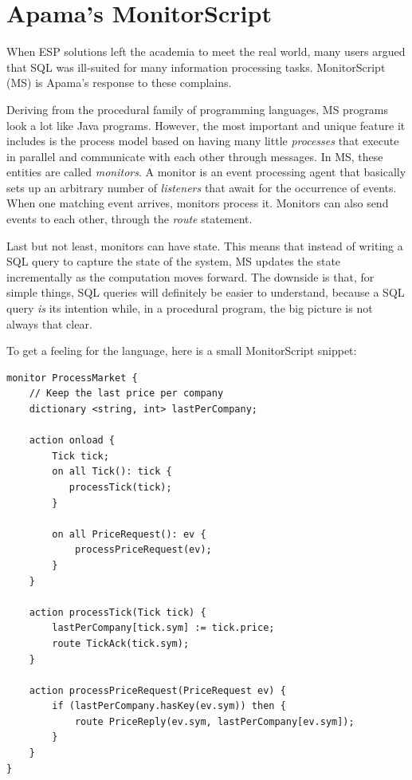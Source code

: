 \documentclass[a4,11pt]{report}
\begin{document}
\section{Apama's MonitorScript}

When ESP solutions left the academia to meet the real world, many
users argued that SQL was ill-suited for many information processing
tasks. MonitorScript (MS) is Apama's response to these complains.

Deriving from the procedural family of programming languages, MS
programs look a lot like Java programs. However, the most important
and unique feature it includes is the process model based on having
many little \emph{processes} that execute in parallel and communicate
with each other through messages. In MS, these entities are called
\emph{monitors}. A monitor is an event processing agent that basically
sets up an arbitrary number of \emph{listeners} that await for the
occurrence of events. When one matching event arrives, monitors
process it. Monitors can also send events to each other, through the
\emph{route} statement.

Last but not least, monitors can have state. This means that instead
of writing a SQL query to capture the state of the system, MS updates
the state incrementally as the computation moves forward. The downside
is that, for simple things, SQL queries will definitely be easier to
understand, because a SQL query \emph{is} its intention while, in a
procedural program, the big picture is not always that clear.

To get a feeling for the language, here is a small MonitorScript
snippet:

\lstset{
  language=MonitorScript,
  columns=fullflexible,
  basicstyle=\tt,
  keywordstyle=[1]\bf,
  keywordstyle=[2]\it,
}


\begin{lstlisting}
monitor ProcessMarket {
    // Keep the last price per company
    dictionary <string, int> lastPerCompany;

    action onload {
        Tick tick;
        on all Tick(): tick {
           processTick(tick);
        }

        on all PriceRequest(): ev {
            processPriceRequest(ev);
        }
    }

    action processTick(Tick tick) {
        lastPerCompany[tick.sym] := tick.price;
        route TickAck(tick.sym);
    }

    action processPriceRequest(PriceRequest ev) {
        if (lastPerCompany.hasKey(ev.sym)) then {
            route PriceReply(ev.sym, lastPerCompany[ev.sym]);
        }
    }
}
\end{lstlisting}
\end{document}

